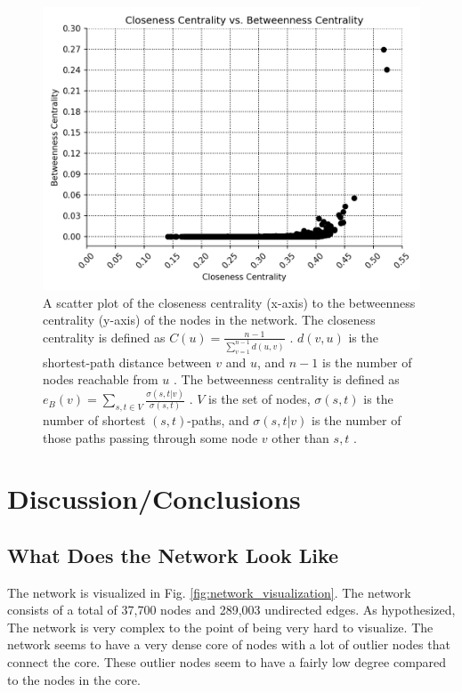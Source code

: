 \documentclass[9pt,twocolumn,twoside]{pnas-new}
\begin{document}
\begin{figure}
\centering
\includegraphics[width=.8\linewidth]{centralities}
\caption{A scatter plot of the closeness centrality (x-axis) to the betweenness centrality (y-axis) of the nodes in the network. The closeness centrality is defined as $C(u) =\frac{n-1}{\sum_{v=1}^{n-1}d(u, v)}$ \cite{networkxclosenesscentrality}. $d(v, u)$ is the shortest-path distance between $v$ and $u$, and $n-1$ is the number of nodes reachable from $u$ \cite{networkxclosenesscentrality}. The betweenness centrality is defined as $e_{B}(v)=\sum_{s,t\in V}^{}\frac{\sigma(s, t|v)}{\sigma(s, t)}$ \cite{networkxbetweennesscentrality}. $V$ is the set of nodes, $\sigma(s, t)$ is the number of shortest $(s, t)$-paths, and $\sigma(s, t|v)$ is the number of those paths passing through some node $v$ other than $s, t$ \cite{networkxbetweennesscentrality}.
}
\label{fig:centralities}
\end{figure}

\section{Discussion/Conclusions}

\subsection{What Does the Network Look Like}

The network is visualized in Fig. \ref{fig:network_visualization}. The network consists of a total of 37,700 nodes and 289,003 undirected edges. As hypothesized, The network is very complex to the point of being very hard to visualize. The network seems to have a very dense core of nodes with a lot of outlier nodes that connect the core. These outlier nodes seem to have a fairly low degree compared to the nodes in the core.
\end{document}
